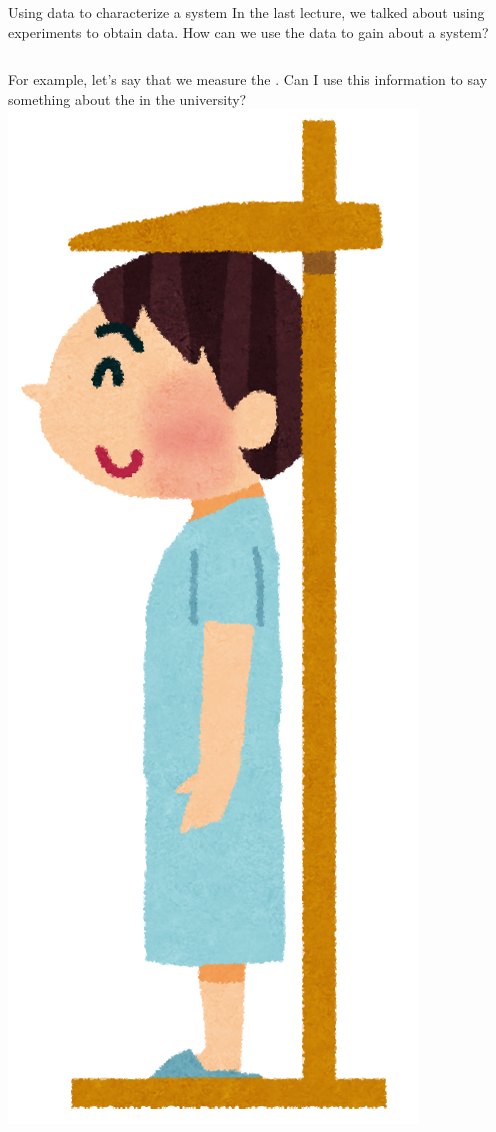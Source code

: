\begin{frame}{Using data to characterize a system}
  In the last lecture, we talked about using experiments to obtain data.
  How can we use the data to gain  about a system?
  \bigskip


  \begin{columns}
    For example, let's say that we measure the . Can I use this information to say something about the
     in the university?
    \includegraphics[width=\textwidth]{../img/irasutoya_height}

\end{columns}
\end{frame}
